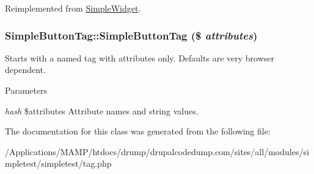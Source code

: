 Reimplemented from \hyperlink{class_simple_widget_a9e048a450e2d29a601e672deda9fa869}{SimpleWidget}.\hypertarget{class_simple_button_tag_abfc68a44b7a968a9255c69f374ed41ec}{
\subsubsection[{SimpleButtonTag}]{\setlength{\rightskip}{0pt plus 5cm}SimpleButtonTag::SimpleButtonTag (\$ {\em attributes})}}
\label{class_simple_button_tag_abfc68a44b7a968a9255c69f374ed41ec}
Starts with a named tag with attributes only. Defaults are very browser dependent. 
\begin{DoxyParams}{Parameters}
\item[{\em hash}]\$attributes Attribute names and string values. \end{DoxyParams}


The documentation for this class was generated from the following file:\begin{DoxyCompactItemize}
\item 
/Applications/MAMP/htdocs/drump/drupalcodedump.com/sites/all/modules/simpletest/simpletest/tag.php\end{DoxyCompactItemize}
